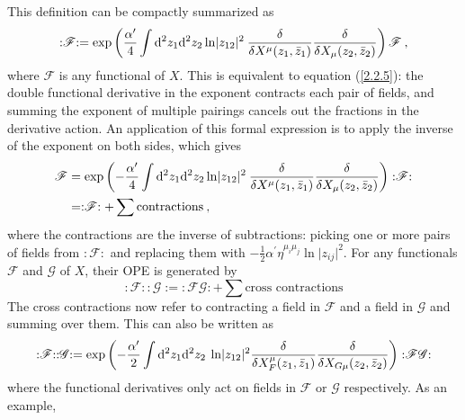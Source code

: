This definition can be compactly summarized as    
\begin{equation}
	: \mathrel{\mathscr{F}}:=\exp \left(\frac{\alpha^{\prime}}{4} \int \mathrm{d}^{2} z_{1} \mathrm{d}^{2} z_{2} \ln \lvert z_{12}\rvert^{2}\: 
	\frac{\delta}{\delta X^{\mu}(z_{1}, \bar{z}_{1})} \frac{\delta}{\delta X_{\mu}(z_{2}, \bar{z}_{2})}\right) \mathscr{F} \:, \label{2.2.7}
\end{equation}
where $\mathscr{F}$ is any functional of $X$.    
This is equivalent to equation (\ref{2.2.5}): the double functional derivative in the exponent contracts each pair of fields, and summing the exponent of multiple pairings cancels out the fractions in the derivative action. An application of this formal expression is to apply the inverse of the exponent on both sides, which gives    
\begin{align}
	\mathscr{F} &=\exp \left(-\frac{\alpha^{\prime}}{4} \int \mathrm{d}^{2} z_{1} \mathrm{d}^{2} z_{2} \ln \lvert z_{12}\rvert^{2}\: 
	\frac{\delta}{\delta X^{\mu}(z_{1}, \bar{z}_{1})} \frac{\delta}{\delta X_{\mu}(z_{2}, \bar{z}_{2})}\right):\mathrel{\mathscr{F}}: \nonumber \\
	&=: \mathrel{\mathscr{F}}:+\sum \text {contractions}\:, \label{2.2.8}
\end{align}
where the contractions are the inverse of subtractions: picking one or more pairs of fields from $:\mathrel{\mathscr{F}}:$ and replacing them with $-\frac{1}{2} \alpha^{\prime} \eta^{\mu_{i} \mu_{j}} \ln \lvert z_{i j}\rvert^{2}$.    
For any functionals $\mathscr{F}$ and $\mathscr{G}$ of $X$, their OPE is generated by    
\begin{equation}
	: \mathrel{\mathscr{F}}: :\mathrel{\mathscr{G}}:=: \mathrel{\mathscr{F} \mathscr{G}}:+\sum \text{cross contractions}
\end{equation}
The cross contractions now refer to contracting a field in $\mathscr{F}$ and a field in $\mathscr{G}$ and summing over them. This can also be written as    
\begin{equation}
	: \mathrel{\mathscr{F}}: :\mathrel{\mathscr{G}}:= \exp \left(-\frac{\alpha^{\prime}}{2} 
	\int \mathrm{d}^{2} z_{1} \mathrm{d}^{2} z_{2}\: \ln \lvert z_{12}\rvert^{2} \frac{\delta}{\delta X_{F}^{\mu}(z_{1}, \bar{z}_{1})} 
	\frac{\delta}{\delta X_{G \mu}(z_{2}, \bar{z}_{2})}\right): \mathrel{\mathscr{F} \mathscr{G}}: \label{2.2.10}
\end{equation}
where the functional derivatives only act on fields in $\mathscr{F}$ or $\mathscr{G}$ respectively.    
As an example,    
